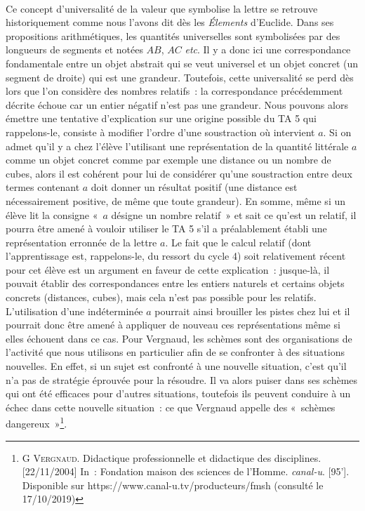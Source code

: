 \documentclass{report}
\theoremstyle{definition}
\begin{document}
\paragraph*{}

Ce concept d'universalité de la valeur que symbolise la lettre se retrouve historiquement comme nous l'avons dit dès les \textit{Élements} d'Euclide. Dans ses propositions arithmétiques, les quantités universelles sont symbolisées par des longueurs de segments et notées $AB$, $AC$ \textit{etc}. Il y a donc ici une correspondance fondamentale entre un objet abstrait qui se veut universel et un objet concret (un segment de droite) qui est une grandeur. Toutefois, cette universalité se perd dès lors que l'on considère des nombres relatifs~: la correspondance précédemment décrite échoue car un entier négatif n'est pas une grandeur.
Nous pouvons alors émettre une tentative d'explication sur une origine possible du TA 5 qui rappelons-le, consiste à modifier l'ordre d'une soustraction où intervient $a$. Si on admet qu'il y a chez l'élève l'utilisant une représentation de la quantité littérale $a$ comme un objet concret comme par exemple une distance ou un nombre de cubes, alors il est cohérent pour lui de considérer qu'une soustraction entre deux termes contenant $a$ doit donner un résultat positif (une distance est nécessairement positive, de même que toute grandeur). En somme, même si un élève lit la consigne «~$a$ désigne un nombre relatif~» et sait ce qu'est un relatif, il pourra être amené à vouloir utiliser le TA 5 s'il a préalablement établi une représentation erronnée de la lettre $a$. Le fait que le calcul relatif (dont l'apprentissage est, rappelons-le, du ressort du cycle 4) soit relativement récent pour cet élève est un argument en faveur de cette explication~: jusque-là, il pouvait établir des correspondances entre les entiers naturels et certains objets concrets (distances, cubes), mais cela n'est pas possible pour les relatifs. L'utilisation d'une indéterminée $a$ pourrait ainsi brouiller les pistes chez lui et il pourrait donc être amené à appliquer de nouveau ces représentations même si elles échouent dans ce cas.
Pour Vergnaud, les schèmes sont des organisations de l'activité que nous utilisons en particulier afin de se confronter à des situations nouvelles. En effet, si un sujet est confronté à une nouvelle situation, c'est qu'il n'a pas de stratégie éprouvée pour la résoudre. Il va alors puiser dans ses schèmes qui ont été efficaces pour d'autres situations, toutefois ils peuvent conduire à un échec dans cette nouvelle situation~: ce que Vergnaud appelle des «~schèmes dangereux~»\footnote{\textsc{G Vergnaud}. Didactique professionnelle et didactique des disciplines. [22/11/2004] In~: Fondation maison des sciences de l'Homme. \textit{canal-u}. [95']. Disponible sur https://www.canal-u.tv/producteurs/fmsh (consulté le 17/10/2019)}.
\end{document}
